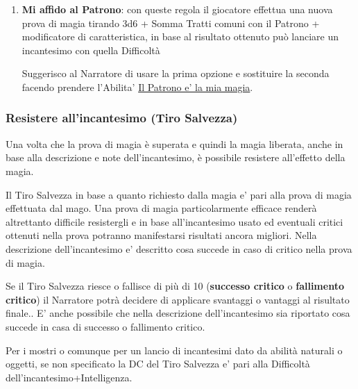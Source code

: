 \begin{multicols}{2}
\begin{enumerate}
Es: Tups fa 6,2,6. Ritira i sei ed ottiene 2,1 per un totale di 17. Non potrà quindi lanciare Invisibilità come aveva sperato (Difficoltà 19) ma potrà comunque lanciare l'incantesimo Spruzzo Colorato (Difficoltà 16)

\item
\textbf{Mi affido al Patrono}: con queste regola il giocatore effettua una nuova prova di magia tirando 3d6 + Somma Tratti comuni con il Patrono + modificatore di caratteristica, in base al risultato ottenuto può lanciare un incantesimo con quella Difficoltà

Suggerisco al Narratore di usare la prima opzione e sostituire la seconda facendo prendere l'Abilita' \hyperlink{ilpatronoelamiamagia}{Il Patrono e' la mia magia}. 

\end{enumerate}

\subsubsection{Resistere all'incantesimo (Tiro Salvezza)}

\label{resistere-allessenza-tiro-salvezza}

Una volta che la prova di magia è superata e quindi la magia liberata, anche in base alla descrizione e note dell'incantesimo, è possibile resistere all'effetto della magia.

Il Tiro Salvezza in base a quanto richiesto dalla magia e' pari alla prova di magia effettuata dal mago. Una prova di magia particolarmente efficace renderà altrettanto difficile resistergli e in base all'incantesimo usato ed eventuali critici ottenuti nella prova potranno manifestarsi risultati ancora migliori. Nella descrizione dell'incantesimo e' descritto cosa succede in caso di critico nella prova di magia.

Se il Tiro Salvezza riesce o fallisce di più di 10 (\textbf{successo critico} o \textbf{fallimento critico}) il Narratore potrà decidere di applicare svantaggi o vantaggi al risultato finale..
E' anche possibile che nella descrizione dell'incantesimo sia riportato cosa succede in casa di successo o fallimento critico. 

Per i mostri o comunque per un lancio di incantesimi dato da abilità naturali o oggetti, se non specificato la DC del Tiro Salvezza e' pari alla Difficoltà dell'incantesimo+Intelligenza.


\end{multicols}
